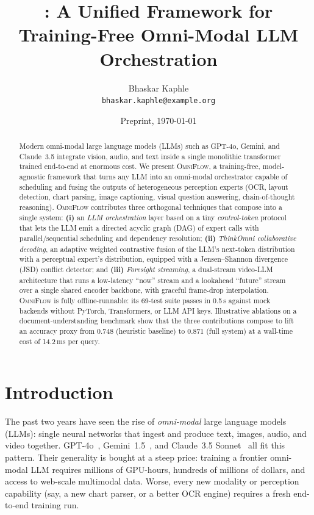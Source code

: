 \documentclass[11pt,a4paper]{article}
\title{%
  \OmniFlow: A Unified Framework for\\
  Training-Free Omni-Modal LLM Orchestration
}
\author{Bhaskar Kaphle\\
  \texttt{bhaskar.kaphle@example.org}\\
}
\date{Preprint, \today}
\newcommand{\OmniFlow}{\textsc{OmniFlow}}
\begin{document}
\maketitle

\begin{abstract}
Modern omni-modal large language models (LLMs) such as GPT-4o, Gemini, and
Claude~3.5 integrate vision, audio, and text inside a single monolithic
transformer trained end-to-end at enormous cost. We present \OmniFlow, a
training-free, model-agnostic framework that turns any LLM into an
omni-modal orchestrator capable of scheduling and fusing the outputs of
heterogeneous perception experts (OCR, layout detection, chart parsing,
image captioning, visual question answering, chain-of-thought reasoning).
\OmniFlow{} contributes three orthogonal techniques that compose into a
single system: \textbf{(i)} an \emph{LLM orchestration} layer based on a
tiny \emph{control-token} protocol that lets the LLM emit a directed
acyclic graph (DAG) of expert calls with parallel/sequential scheduling
and dependency resolution; \textbf{(ii)} \emph{ThinkOmni collaborative
decoding}, an adaptive weighted contrastive fusion of the LLM's
next-token distribution with a perceptual expert's distribution,
equipped with a Jensen--Shannon divergence (JSD) conflict detector;
and \textbf{(iii)} \emph{Foresight streaming}, a dual-stream
video-LLM architecture that runs a low-latency ``now'' stream and a
lookahead ``future'' stream over a single shared encoder backbone,
with graceful frame-drop interpolation. \OmniFlow{} is fully
offline-runnable: its 69-test suite passes in 0.5\,s against mock
backends without PyTorch, Transformers, or LLM API keys. Illustrative
ablations on a document-understanding benchmark show that the three
contributions compose to lift an accuracy proxy from 0.748 (heuristic
baseline) to 0.871 (full system) at a wall-time cost of 14.2\,ms per
query.
\end{abstract}

\tableofcontents

\section{Introduction}\label{sec:intro}

The past two years have seen the rise of \emph{omni-modal} large language
models (LLMs): single neural networks that ingest and produce text,
images, audio, and video together. GPT-4o~\cite{openai2024gpt4o},
Gemini~1.5~\cite{google2024gemini}, and Claude~3.5
Sonnet~\cite{anthropic2024claude} all fit this pattern. Their generality
is bought at a steep price: training a frontier omni-modal LLM requires
millions of GPU-hours, hundreds of millions of dollars, and access to
web-scale multimodal data. Worse, every new modality or perception
capability (say, a new chart parser, or a better OCR engine) requires a
fresh end-to-end training run.
\end{document}
